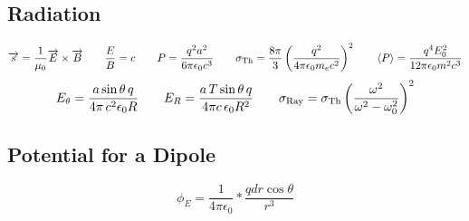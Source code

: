 \documentclass{article}
\begin{document}
\subsection*{Radiation}
\[\overrightarrow{s}=\frac{1}{\mu_0}\overrightarrow{E}\times\overrightarrow{B}\hspace{7 mm}\frac{E}{B}=c\hspace{7 mm}P=\frac{q^2a^2}{6\pi\epsilon_0c^3}\hspace{7 mm}\sigma_{\textnormal{Th}}=\frac{8\pi}{3}\left(\frac{q^2}{4\pi\epsilon_0m_ec^2}\right)^2\hspace{7 mm}\left<P\right>=\frac{q^4E_0^2}{12\pi\epsilon_0m^2c^3}\]
\[E_\theta=\frac{a\sin\theta\,q}{4\pi\,c^2\epsilon_0R}\hspace{7 mm}E_R=\frac{a\,T\sin\theta\,q}{4\pi c\,\epsilon_0R^2}\hspace{7 mm}\sigma_\textnormal{Ray}=\sigma_\textnormal{Th}\left(\frac{\omega^2}{\omega^2-\omega_0^2}\right)^2\]
\subsection*{Potential for a Dipole}
\[\phi_E=\frac{1}{4\pi\epsilon_0}*\frac{qdr\cos\theta}{r^3}\]
\end{document}
